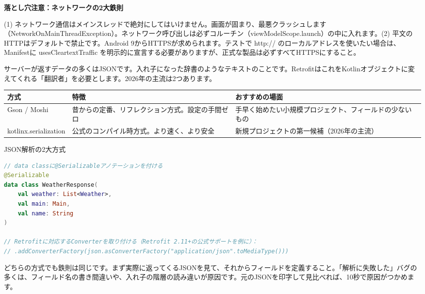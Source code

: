 \textbf{落とし穴注意：ネットワークの2大鉄則}\par

(1) ネットワーク通信はメインスレッドで絶対にしてはいけません。画面が固まり、最悪クラッシュします（NetworkOnMainThreadException）。ネットワーク呼び出しは必ずコルーチン（viewModelScope.launch）の中に入れます。(2) 平文のHTTPはデフォルトで禁止です。Android 9からHTTPSが求められます。テストで http:// のローカルアドレスを使いたい場合は、Manifestに usesCleartextTraffic を明示的に宣言する必要がありますが、正式な製品は必ずすべてHTTPSにすること。


サーバーが返すデータの多くはJSONです。入れ子になった辞書のようなテキストのことです。RetrofitはこれをKotlinオブジェクトに変えてくれる「翻訳者」を必要とします。2026年の主流は2つあります。

\begin{center}
\begin{tabularx}{\linewidth}{|X|X|X|}
\hline
\textbf{方式} & \textbf{特徴} & \textbf{おすすめの場面} \tabularnewline
\hline
Gson / Moshi & 昔からの定番、リフレクション方式。設定の手間ゼロ & 手早く始めたい小規模プロジェクト、フィールドの少ないもの \tabularnewline
kotlinx.serialization & 公式のコンパイル時方式。より速く、より安全 & 新規プロジェクトの第一候補（2026年の主流） \tabularnewline
\hline
\end{tabularx}
\end{center}

\begin{center}\small\color{gray}JSON解析の2大方式\end{center}

\begin{lstlisting}[language=Kotlin]
// data classに@Serializableアノテーションを付ける
@Serializable
data class WeatherResponse(
    val weather: List<Weather>,
    val main: Main,
    val name: String
)

// Retrofitに対応するConverterを取り付ける（Retrofit 2.11+の公式サポートを例に）：
// .addConverterFactory(json.asConverterFactory("application/json".toMediaType()))
\end{lstlisting}

どちらの方式でも鉄則は同じです。まず実際に返ってくるJSONを見て、それからフィールドを定義すること。「解析に失敗した」バグの多くは、フィールド名の書き間違いや、入れ子の階層の読み違いが原因です。元のJSONを印字して見比べれば、10秒で原因がつかめます。


